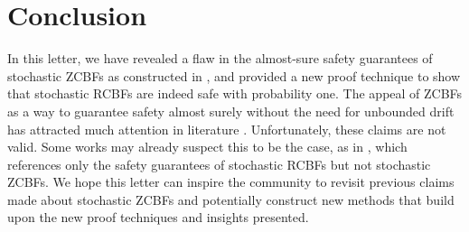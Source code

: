 \documentclass[twocolumn,amsthm]{autart}
\begin{document}
\section{Conclusion}
In this letter, we have revealed a flaw in the almost-sure safety guarantees of stochastic ZCBFs as constructed in \cite[Theorem 4]{clark2021control}, and provided a new proof technique to show that stochastic RCBFs are indeed safe with probability one.
The appeal of ZCBFs as a way to guarantee safety almost surely without the need for unbounded drift has attracted much attention in literature \cite{pereira2021safe,song2022generalization,vahs2023non,vahs2023risk,enwerem2023safe}. Unfortunately, these claims are not valid. Some works may already suspect this to be the case, as in \cite{wang2021safety}, which references only the safety guarantees of stochastic RCBFs but not stochastic ZCBFs.
We hope this letter can inspire the community to revisit previous claims made about stochastic ZCBFs and potentially construct new methods that build upon the new proof techniques and insights presented.
\end{document}
